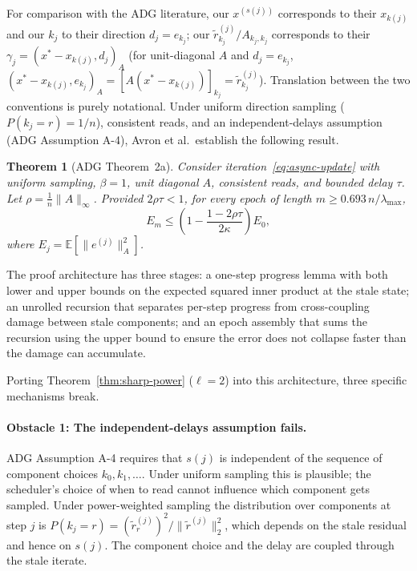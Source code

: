 \documentclass[pdflatex,sn-mathphys-num]{sn-jnl}%
\newcommand{\E}{\mathbb{E}}
\newcommand{\Anorm}[1]{\|#1\|_{A}}
\newcommand{\lmax}{\lambda_{\max}}
\theoremstyle{thmstyleone}%
\newtheorem{theorem}{Theorem}%
\theoremstyle{thmstyletwo}%
\theoremstyle{thmstylethree}%
\begin{document}
For comparison with the ADG literature, our $x^{(s(j))}$ corresponds to their $x_{k(j)}$ and our $k_j$ to their direction $d_j = e_{k_j}$; our $\tilde r_{k_j}^{(j)}/A_{k_j,k_j}$ corresponds to their $\gamma_j = (x^* - x_{k(j)}, d_j)_A$ (for unit-diagonal $A$ and $d_j = e_{k_j}$, $(x^* - x_{k(j)}, e_{k_j})_A = [A(x^* - x_{k(j)})]_{k_j} = \tilde r_{k_j}^{(j)}$). Translation between the two conventions is purely notational.
Under uniform direction sampling ($P(k_j = r) = 1/n$), consistent reads, and an independent-delays assumption (ADG Assumption A-4), Avron et al.\ establish the following result.

\begin{theorem}[ADG Theorem~2a]
\label{thm:avron-async}
Consider iteration~\eqref{eq:async-update} with uniform sampling, $\beta = 1$, unit diagonal $A$, consistent reads, and bounded delay $\tau$. Let $\rho = \frac{1}{n}\|A\|_\infty$. Provided $2\rho\tau < 1$, for every epoch of length $m \geq 0.693\,n/\lmax$,
$$
E_m \leq \left(1 - \frac{1 - 2\rho\tau}{2\kappa}\right) E_0,
$$
where $E_j = \E[\Anorm{e^{(j)}}^2]$.
\end{theorem}

The proof architecture has three stages: a one-step progress lemma with
both lower and upper bounds on the expected squared inner product at
the stale state; an unrolled recursion that separates per-step
progress from cross-coupling damage between stale components; and an
epoch assembly that sums the recursion using the upper bound to ensure
the error does not collapse faster than the damage can accumulate.


Porting Theorem~\ref{thm:sharp-power} ($\ell = 2$) into this architecture, three specific mechanisms break.

\paragraph{Obstacle 1: The independent-delays assumption fails.} ADG Assumption A-4 requires that $s(j)$ is independent of the sequence of component choices $k_0, k_1, \ldots$. Under uniform sampling this is plausible; the scheduler's choice of when to read cannot influence which component gets sampled. Under power-weighted sampling the distribution over components at step $j$ is $P(k_j = r) = (\tilde r_r^{(j)})^2 / \|\tilde r^{(j)}\|_2^2$, which depends on the stale residual and hence on $s(j)$. The component choice and the delay are coupled through the stale iterate.
\end{document}
